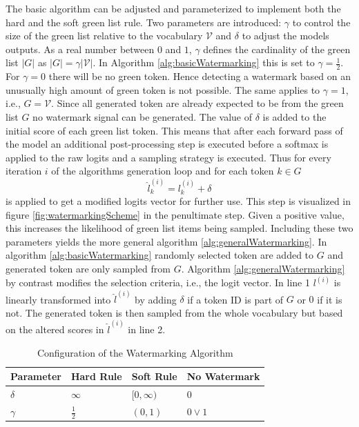     The basic algorithm can be adjusted and parameterized to implement both the hard and the soft green list rule. 
    Two parameters are introduced: $\gamma$ to control the size of the green list relative to the vocabulary $\mathcal{V}$ and $\delta$ to adjust the models outputs.
    As a real number between $0$ and $1$, $\gamma$ defines the cardinality of the green list $|G|$ as $|G| = \gamma |\mathcal{V}|$.
    In Algorithm \ref{alg:basicWatermarking} this is set to $\gamma = \frac{1}{2}$.
    For $\gamma = 0$ there will be no green token.
    Hence detecting a watermark based on an unusually high amount of green token is not possible.
    The same applies to $\gamma =1$, i.e., $G = \mathcal{V}$.
    Since all generated token are already expected to be from the green list $G$ no watermark signal can be generated.
    The value of $\delta$ is added to the initial score of each green list token.
    This means that after each forward pass of the model an additional post-processing step is executed before a softmax is applied to the raw logits and a sampling strategy is executed.
    Thus for every iteration $i$ of the algorithms generation loop and for each token $k \in G$ 
    \begin{equation}
        \hat{l}^{(i)}_k = l^{(i)}_k + \delta
    \end{equation}
    is applied to get a modified logits vector for further use.
    This step is visualized in figure \ref{fig:watermarkingScheme} in the penultimate step.
    Given a positive value, this increases the likelihood of green list items being sampled.
    Including these two parameters yields the more general algorithm \ref{alg:generalWatermarking}.
    In algorithm \ref{alg:basicWatermarking} randomly selected token are added to $G$ and generated token are only sampled from $G$.
    Algorithm \ref{alg:generalWatermarking} by contrast modifies the selection criteria, i.e., the logit vector.
    In line 1 $l^{(i)}$ is linearly transformed into $\hat{l}^{(i)}$ by adding $\delta$ if a token ID is part of $G$ or $0$ if it is not.
    The generated token is then sampled from the whole vocabulary but based on the altered scores in $\hat{l}^{(i)}$ in line 2.

    \begin{table}
        \centering
        \begin{tabular}{llll}
            \toprule
            Parameter & Hard Rule & Soft Rule & No Watermark\\ \midrule
            $\delta$ & $\infty$ & $[0,\infty)$ & $0$\\
            $\gamma$ &  $\frac{1}{2}$ & $(0,1)$ & $0 \lor 1$\\
            \bottomrule
        \end{tabular}
        \caption{Configuration of the Watermarking Algorithm}
        \label{tab:watermarkingParams} 
    \end{table}

